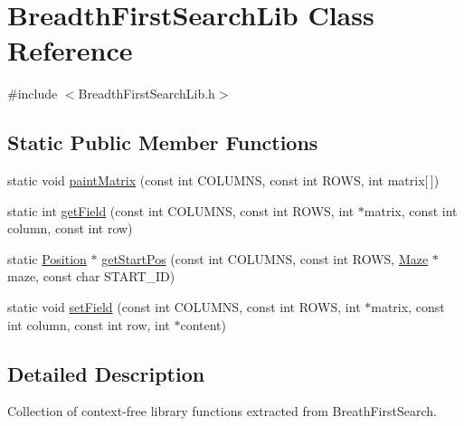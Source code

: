 \hypertarget{class_breadth_first_search_lib}{\section{Breadth\-First\-Search\-Lib Class Reference}
\label{class_breadth_first_search_lib}
}


{\ttfamily \#include $<$Breadth\-First\-Search\-Lib.\-h$>$}

\subsection*{Static Public Member Functions}
\begin{DoxyCompactItemize}
\item 
static void \hyperlink{class_breadth_first_search_lib_acb4a80e7b47617c9ea478a6e5b286015}{paint\-Matrix} (const int C\-O\-L\-U\-M\-N\-S, const int R\-O\-W\-S, int matrix\mbox{[}$\,$\mbox{]})
\item 
static int \hyperlink{class_breadth_first_search_lib_a590126086844fa974397714536ce3cbb}{get\-Field} (const int C\-O\-L\-U\-M\-N\-S, const int R\-O\-W\-S, int $\ast$matrix, const int column, const int row)
\item 
static \hyperlink{class_position}{Position} $\ast$ \hyperlink{class_breadth_first_search_lib_a2426f93e31804b1e07ee3101c9507d63}{get\-Start\-Pos} (const int C\-O\-L\-U\-M\-N\-S, const int R\-O\-W\-S, \hyperlink{class_maze}{Maze} $\ast$maze, const char S\-T\-A\-R\-T\-\_\-\-I\-D)
\item 
static void \hyperlink{class_breadth_first_search_lib_a21d08cb771c1cff3fb22863e0b345ab0}{set\-Field} (const int C\-O\-L\-U\-M\-N\-S, const int R\-O\-W\-S, int $\ast$matrix, const int column, const int row, int $\ast$content)
\end{DoxyCompactItemize}


\subsection{Detailed Description}
Collection of context-\/free library functions extracted from Breath\-First\-Search. 

